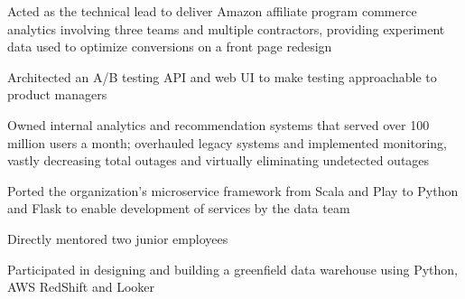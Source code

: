 \begin{job}

  \begin{accomplishments}
    \item Acted as the technical lead to deliver Amazon affiliate program
    commerce analytics involving three teams and multiple contractors, providing
    experiment data used to optimize conversions on a front page redesign
    \item Architected an A/B testing API and web UI to make testing approachable
    to product managers
    \item Owned internal analytics and recommendation systems that served over
    100 million users a month; overhauled legacy systems and implemented
    monitoring, vastly decreasing total outages and virtually eliminating
    undetected outages
    \item Ported the organization's microservice framework from Scala and Play
    to Python and Flask to enable development of services by the data team
    \item Directly mentored two junior employees
  \end{accomplishments}
  \begin{extendedaccomplishments}

    \item Participated in designing and building a greenfield data warehouse
    using Python, AWS RedShift and Looker
  \end{extendedaccomplishments}
\end{job}
